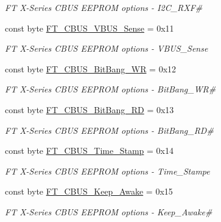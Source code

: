 \begin{DoxyCompactItemize}
\begin{DoxyCompactList}\small\item\em FT X-\/\+Series C\+B\+US E\+E\+P\+R\+OM options -\/ I2\+C\+\_\+\+R\+XF\# \end{DoxyCompactList}\item 
const byte \mbox{\hyperlink{class_f_t_d2_x_x___n_e_t_1_1_f_t_d_i_1_1_f_t___x_s_e_r_i_e_s___c_b_u_s___o_p_t_i_o_n_s_a3c5ec955c711a38492710f79153d33ad}{F\+T\+\_\+\+C\+B\+U\+S\+\_\+\+V\+B\+U\+S\+\_\+\+Sense}} = 0x11
\begin{DoxyCompactList}\small\item\em FT X-\/\+Series C\+B\+US E\+E\+P\+R\+OM options -\/ V\+B\+U\+S\+\_\+\+Sense \end{DoxyCompactList}\item 
const byte \mbox{\hyperlink{class_f_t_d2_x_x___n_e_t_1_1_f_t_d_i_1_1_f_t___x_s_e_r_i_e_s___c_b_u_s___o_p_t_i_o_n_s_ae5e96092775b05cba36a81d0cc865c9f}{F\+T\+\_\+\+C\+B\+U\+S\+\_\+\+Bit\+Bang\+\_\+\+WR}} = 0x12
\begin{DoxyCompactList}\small\item\em FT X-\/\+Series C\+B\+US E\+E\+P\+R\+OM options -\/ Bit\+Bang\+\_\+\+WR\# \end{DoxyCompactList}\item 
const byte \mbox{\hyperlink{class_f_t_d2_x_x___n_e_t_1_1_f_t_d_i_1_1_f_t___x_s_e_r_i_e_s___c_b_u_s___o_p_t_i_o_n_s_a69f7d1805460808858f820f15c0bb032}{F\+T\+\_\+\+C\+B\+U\+S\+\_\+\+Bit\+Bang\+\_\+\+RD}} = 0x13
\begin{DoxyCompactList}\small\item\em FT X-\/\+Series C\+B\+US E\+E\+P\+R\+OM options -\/ Bit\+Bang\+\_\+\+RD\# \end{DoxyCompactList}\item 
const byte \mbox{\hyperlink{class_f_t_d2_x_x___n_e_t_1_1_f_t_d_i_1_1_f_t___x_s_e_r_i_e_s___c_b_u_s___o_p_t_i_o_n_s_a500c31117ae807de50ec30a26ebf88e4}{F\+T\+\_\+\+C\+B\+U\+S\+\_\+\+Time\+\_\+\+Stamp}} = 0x14
\begin{DoxyCompactList}\small\item\em FT X-\/\+Series C\+B\+US E\+E\+P\+R\+OM options -\/ Time\+\_\+\+Stampe \end{DoxyCompactList}\item 
const byte \mbox{\hyperlink{class_f_t_d2_x_x___n_e_t_1_1_f_t_d_i_1_1_f_t___x_s_e_r_i_e_s___c_b_u_s___o_p_t_i_o_n_s_a954384af9e98d0c7ca993a1ca7883b46}{F\+T\+\_\+\+C\+B\+U\+S\+\_\+\+Keep\+\_\+\+Awake}} = 0x15
\begin{DoxyCompactList}\small\item\em FT X-\/\+Series C\+B\+US E\+E\+P\+R\+OM options -\/ Keep\+\_\+\+Awake\# \end{DoxyCompactList}\end{DoxyCompactItemize}


